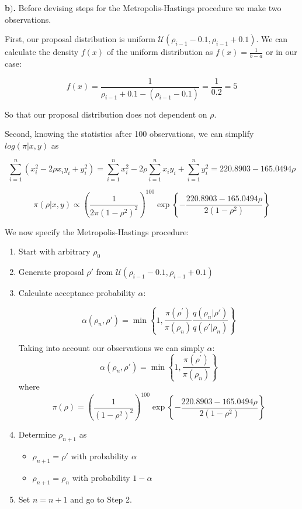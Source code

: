 \documentclass[a4 paper]{article}
\begin{document}
\textbf{b$)$.} Before devising steps for the 
Metropolis-Hastings 
procedure we make two observations.

First, our proposal distribution is uniform
$\mathcal{U}\left(\rho_{i-1}-0.1, \rho_{i-1}+0.1\right)$.
We can calculate the density $f(x)$ of the uniform 
distribution as $f(x)=\frac{1}{b-a}$ or
in our case:

$$
f(x)=\frac{1}{\rho_{i-1}+0.1-\left(\rho_{i-1}-0.1\right)}=\frac{1}{0.2}=5
$$

So that our proposal distribution does not dependent on
$\rho$.


Second, knowing the statistics after 100 observations,
we can simplify $log(\pi|x,y)$ as

$$
\sum_{i=1}^{n}\left(x_{i}^{2}-2\rho x_{i}y_{i}+y_{i}^{2}\right)=\sum_{i=1}^{n}x_{i}^{2}-2\rho\sum_{i=1}^{n}x_{i}y_{i}+\sum_{i=1}^{n}y_{i}^{2}=220.8903-165.0494\rho
$$

$$
\pi(\rho|x,y)\propto\left(\frac{1}{2\pi\left(1-\rho^{2}\right)^{2}}\right)^{100}\exp\left\{ -\frac{220.8903-165.0494\rho}{2\left(1-\rho^{2}\right)}\right\} 	
$$





We now specify the Metropolis-Hastings 
procedure:

\begin{enumerate}
	\item Start with arbitrary $\rho_0$
	
	\item Generate proposal $\rho'$ from $\mathcal{U}\left(\rho_{i-1}-0.1, \rho_{i-1}+0.1\right)$
	
	\item Calculate acceptance probability 
	$\alpha$:

$$
\alpha\left(\rho_{n},\rho'\right)=\min\left\{ 1,\frac{\pi\left(\rho^{\prime}\right)}{\pi\left(\rho_{n}\right)}\frac{q\left(\rho_{n}|\rho'\right)}{q\left(\rho'|\rho_{n}\right)}\right\} 
$$

Taking into account our observations we can simply $\alpha$:
$$
\alpha\left(\rho_{n},\rho'\right)=\min\left\{ 1,\frac{\pi\left(\rho^{\prime}\right)}{\pi\left(\rho_{n}\right)}\right\} 
$$
where 
$$
\pi\left(\rho\right)=\left(\frac{1}{\left(1-\rho^{2}\right)^{2}}\right)^{100}\exp\left\{ -\frac{220.8903-165.0494\rho}{2\left(1-\rho^{2}\right)}\right\} 
$$


	\item Determine $\rho_{n+1}$ as
	\begin{itemize}
		\item $\rho_{n+1}=\rho'$ with probability $\alpha$
		\item $\rho_{n+1}=\rho_{n}$ with probability $1-\alpha$
	\end{itemize}
	
	
	\item Set $n =n+1$ and go to Step 2.
	
\end{enumerate}
\end{document}
